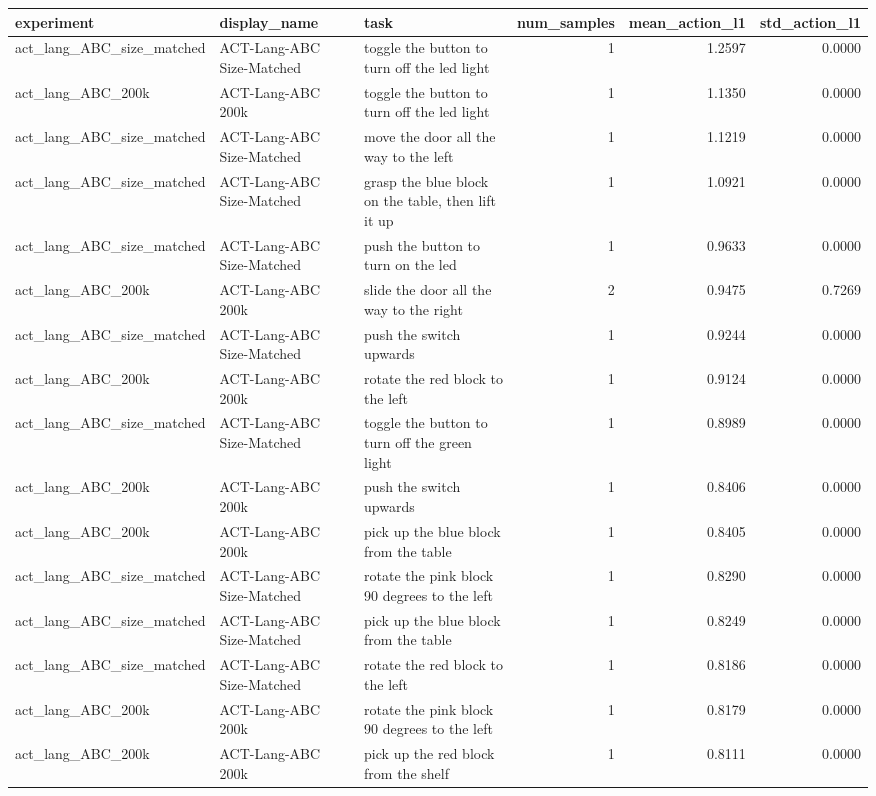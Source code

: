 \begin{tabular}{lllrrr}
\toprule
experiment & display\_name & task & num\_samples & mean\_action\_l1 & std\_action\_l1 \\
\midrule
act\_lang\_ABC\_size\_matched & ACT-Lang-ABC Size-Matched & toggle the button to turn off the led light & 1 & 1.2597 & 0.0000 \\
act\_lang\_ABC\_200k & ACT-Lang-ABC 200k & toggle the button to turn off the led light & 1 & 1.1350 & 0.0000 \\
act\_lang\_ABC\_size\_matched & ACT-Lang-ABC Size-Matched & move the door all the way to the left & 1 & 1.1219 & 0.0000 \\
act\_lang\_ABC\_size\_matched & ACT-Lang-ABC Size-Matched & grasp the blue block on the table, then lift it up & 1 & 1.0921 & 0.0000 \\
act\_lang\_ABC\_size\_matched & ACT-Lang-ABC Size-Matched & push the button to turn on the led & 1 & 0.9633 & 0.0000 \\
act\_lang\_ABC\_200k & ACT-Lang-ABC 200k & slide the door all the way to the right & 2 & 0.9475 & 0.7269 \\
act\_lang\_ABC\_size\_matched & ACT-Lang-ABC Size-Matched & push the switch upwards & 1 & 0.9244 & 0.0000 \\
act\_lang\_ABC\_200k & ACT-Lang-ABC 200k & rotate the red block to the left & 1 & 0.9124 & 0.0000 \\
act\_lang\_ABC\_size\_matched & ACT-Lang-ABC Size-Matched & toggle the button to turn off the green light & 1 & 0.8989 & 0.0000 \\
act\_lang\_ABC\_200k & ACT-Lang-ABC 200k & push the switch upwards & 1 & 0.8406 & 0.0000 \\
act\_lang\_ABC\_200k & ACT-Lang-ABC 200k & pick up the blue block from the table & 1 & 0.8405 & 0.0000 \\
act\_lang\_ABC\_size\_matched & ACT-Lang-ABC Size-Matched & rotate the pink block 90 degrees to the left & 1 & 0.8290 & 0.0000 \\
act\_lang\_ABC\_size\_matched & ACT-Lang-ABC Size-Matched & pick up the blue block from the table & 1 & 0.8249 & 0.0000 \\
act\_lang\_ABC\_size\_matched & ACT-Lang-ABC Size-Matched & rotate the red block to the left & 1 & 0.8186 & 0.0000 \\
act\_lang\_ABC\_200k & ACT-Lang-ABC 200k & rotate the pink block 90 degrees to the left & 1 & 0.8179 & 0.0000 \\
act\_lang\_ABC\_200k & ACT-Lang-ABC 200k & pick up the red block from the shelf & 1 & 0.8111 & 0.0000 \\

\end{tabular}

